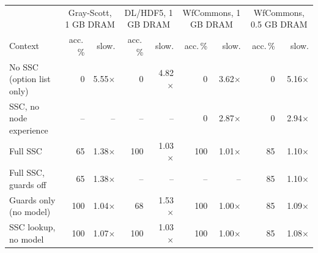 \begin{tabular}{lrrrrrrrr}
\toprule
 & \multicolumn{2}{c}{Gray-Scott, 1 GB DRAM} & \multicolumn{2}{c}{DL/HDF5, 1 GB DRAM} & \multicolumn{2}{c}{WfCommons, 1 GB DRAM} & \multicolumn{2}{c}{WfCommons, 0.5 GB DRAM} \\
Context & acc.\,\% & slow. & acc.\,\% & slow. & acc.\,\% & slow. & acc.\,\% & slow. \\
\midrule
No SSC (option list only) & 0 & 5.55$\times$ & 0 & 4.82$\times$ & 0 & 3.62$\times$ & 0 & 5.16$\times$ \\
SSC, no node experience & -- & -- & -- & -- & 0 & 2.87$\times$ & 0 & 2.94$\times$ \\
Full SSC & 65 & 1.38$\times$ & 100 & 1.03$\times$ & 100 & 1.01$\times$ & 85 & 1.10$\times$ \\
Full SSC, guards off & 65 & 1.38$\times$ & -- & -- & -- & -- & 85 & 1.10$\times$ \\
Guards only (no model) & 100 & 1.04$\times$ & 68 & 1.53$\times$ & 100 & 1.00$\times$ & 85 & 1.09$\times$ \\
SSC lookup, no model & 100 & 1.07$\times$ & 100 & 1.03$\times$ & 100 & 1.00$\times$ & 85 & 1.08$\times$ \\
\bottomrule
\end{tabular}
